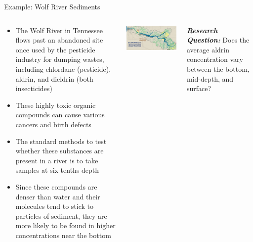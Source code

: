 \documentclass[
  ignorenonframetext,
]{beamer}
\providecommand{\tightlist}{%
  \setlength{\itemsep}{0pt}\setlength{\parskip}{0pt}}\usepackage{longtable,booktabs,array}
\begin{document}
\begin{frame}{Example: Wolf River Sediments}
\label{example-wolf-river-sediments}
\begin{columns}[T]
\begin{column}{0.48\textwidth}
\begin{itemize}
\tightlist
\item
  The Wolf River in Tennessee flows past an abandoned site once used by
  the pesticide industry for dumping wastes, including chlordane
  (pesticide), aldrin, and dieldrin (both insecticides)
\item
  These highly toxic organic compounds can cause various cancers and
  birth defects
\item
  The standard methods to test whether these substances are present in a
  river is to take samples at six-tenths depth
\item
  Since these compounds are denser than water and their molecules tend
  to stick to particles of sediment, they are more likely to be found in
  higher concentrations near the bottom
\end{itemize}
\end{column}

\begin{column}{0.48\textwidth}
\includegraphics{class30_files/mediabag/wolf-river-map.png}
\end{column}

\textbf{\emph{Research Question:}} Does the average aldrin concentration
vary between the bottom, mid-depth, and surface?


\end{columns}
\end{frame}
\end{document}

